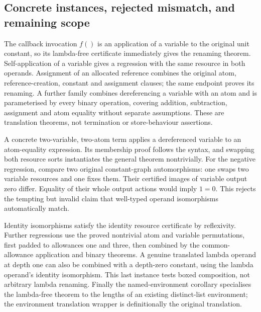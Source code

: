 \subsection{Concrete instances, rejected mismatch, and remaining scope}

The callback invocation $f()$ is an application of a variable to the
original unit constant, so its lambda-free certificate immediately gives the
renaming theorem. Self-application of a variable gives a regression with the
same resource in both operands. Assignment of an allocated reference combines
the original atom, reference-creation, constant and assignment clauses; the
same endpoint proves its renaming. A further family combines dereferencing a
variable with an atom and is parameterised by every binary operation, covering
addition, subtraction, assignment and atom equality without separate assumptions.
These are translation theorems, not termination or store-behaviour assertions.


A concrete two-variable, two-atom term applies a dereferenced variable
to an atom-equality expression. Its membership proof follows the syntax, and
swapping both resource sorts instantiates the general theorem nontrivially.
For the negative regression, compare two original constant-graph automorphisms:
one swaps two variable resources and one fixes them. Their certified images of
variable output zero differ. Equality of their whole output actions would imply
$1=0$. This rejects the tempting but invalid claim that well-typed operand
isomorphisms automatically match.


Identity isomorphisms satisfy the identity resource certificate by
reflexivity. Further regressions use the proved nontrivial atom and variable
permutations, first padded to allowances one and three, then combined by the
common-allowance application and binary theorems. A genuine translated lambda
operand at depth one can also be combined with a depth-zero constant, using the
lambda operand's identity isomorphism. This last instance tests boxed composition,
not arbitrary lambda renaming. Finally the named-environment corollary specialises
the lambda-free theorem to the lengths of an existing distinct-list environment;
the environment translation wrapper is definitionally the original translation.

